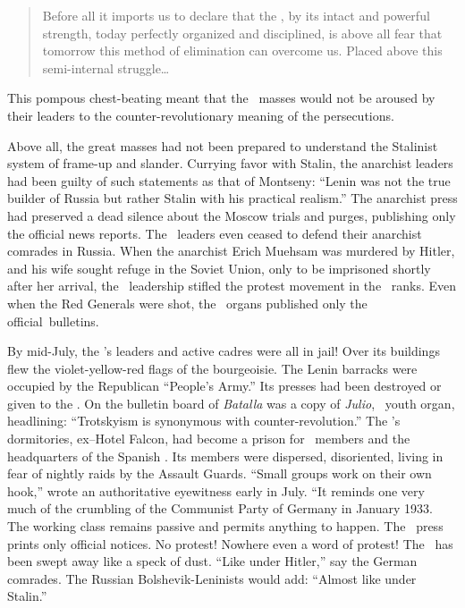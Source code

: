 \begin{quotation}
  Before all it imports us to declare that the \CNT, by its intact and powerful strength, today perfectly organized and disciplined, is above all fear that tomorrow this method of elimination can overcome us. Placed above this semi-internal struggle\dots
\end{quotation}

This pompous chest-beating meant that the \CNT\ masses would not be aroused by their leaders to the counter-revolutionary meaning of the persecutions.

Above all, the great masses had not been prepared to understand the Stalinist system of frame-up and slander. Currying favor with Stalin, the anarchist leaders had been guilty of such statements as that of Montseny: ``Lenin was not the true builder of Russia but rather Stalin with his practical realism.'' The anarchist press had preserved a dead silence about the Moscow trials and purges, publishing only the official news reports. The \CNT\ leaders even ceased to defend their anarchist comrades in Russia. When the anarchist Erich Muehsam was murdered by Hitler, and his wife sought refuge in the Soviet Union\indexUSSR, only to be imprisoned shortly after her arrival, the \CNT\ leadership stifled the protest movement in the \CNT\ ranks. Even when the Red Generals were shot, the \CNT\ organs published only the official~bulletins.

By mid-July, the \POUM’s leaders and active cadres were all in jail! Over its buildings flew the violet-yellow-red flags of the bourgeoisie. The Lenin barracks were occupied by the Republican ``People’s Army.'' Its presses had been destroyed or given to the \PSUC. On the bulletin board of \emph{Batalla} was a copy of \emph{Julio}, \PSUC\ youth organ, headlining: ``Trotskyism is synonymous with counter-revolution.'' The \POUM’s dormitories, ex--Hotel Falcon, had become a prison for \POUM\ members and the headquarters of the Spanish \GPU\indexGPU{}. Its members were dispersed, disoriented, living in fear of nightly raids by the Assault Guards. ``Small groups work on their own hook,'' wrote an authoritative eyewitness early in July. ``It reminds one very much of the crumbling of the Communist Party of Germany in January 1933. The working class remains passive and permits anything to happen. The \CNT\ press prints only official notices. No protest! Nowhere even a word of protest! The \POUM\ has been swept away like a speck of dust. “Like under Hitler{\indexAHitler},” say the German comrades. The Russian Bolshevik-Leninists would add: “Almost like under Stalin.”

